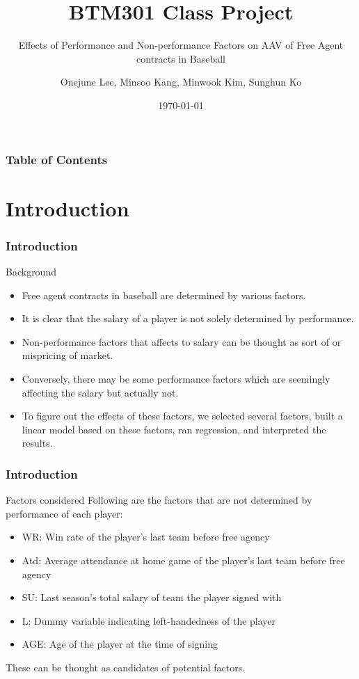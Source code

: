 \documentclass[9pt]{beamer}
\subtitle{Effects of Performance and Non-performance Factors on AAV of Free Agent contracts in Baseball}
\title{BTM301 Class Project}
\author[Team 1]{
    Onejune Lee,
    Minsoo Kang,
    Minwook Kim,
    Sunghun Ko
}
\institute{KAIST}
\date{\today}
\begin{document}
\begin{frame}
    \titlepage
\end{frame}
\begin{frame}
    \frametitle{Table of Contents}
    \tableofcontents
\end{frame}

\section{Introduction}
\begin{frame}
    \frametitle{Introduction}
    \begin{block}{Background}
        \begin{itemize}
            \item Free agent contracts in baseball are determined by various factors.
            \item It is clear that the salary of a player is not solely determined by performance.
            \item Non-performance factors that affects to salary can be thought as sort of  or mispricing of market.
            \item Conversely, there may be some performance factors which are seemingly affecting the salary but actually not.
            \item To figure out the effects of these factors, we selected several factors, built a linear model based on these factors, ran regression, and interpreted the results.
        \end{itemize}
    \end{block}
\end{frame}
\begin{frame}
    \frametitle{Introduction}
    \begin{block}{Factors considered}
        Following are the factors that are not determined by performance of each player:
        \begin{itemize}
            \item WR: Win rate of the player's last team before free agency
            \item Atd: Average attendance at home game of the player's last team before free agency
            \item SU: Last season's total salary of team the player signed with
            \item L: Dummy variable indicating left-handedness of the player
            \item AGE: Age of the player at the time of signing
        \end{itemize}
        These can be thought as candidates of potential  factors.
    \end{block}
\end{frame}
\end{document}
